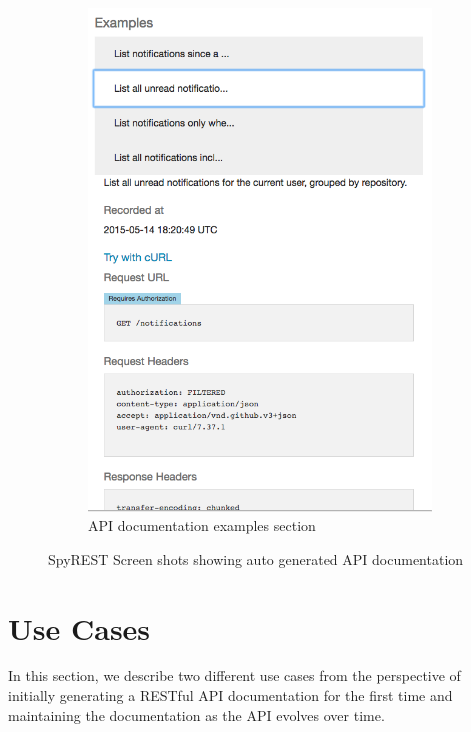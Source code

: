 \documentclass[conference]{IEEEtran}
\begin{document}
\begin{figure}[!tbh]
\begin{mdframed}
\begin{subfigure}[t]{0.5\textwidth}
      \includegraphics[width=\linewidth]{examples.png}
      \caption{API documentation examples section}
      \label{fig:examples}
    \end{subfigure}
    \caption{SpyREST Screen shots showing auto generated API documentation}
    \label{fig:spyrest_screenshots}
  \end{mdframed}
\end{figure}

\section{Use Cases}
In this section, we describe two different use cases from the perspective of initially generating a RESTful API documentation for the first time and  maintaining the documentation as the API evolves over time.
\end{document}
